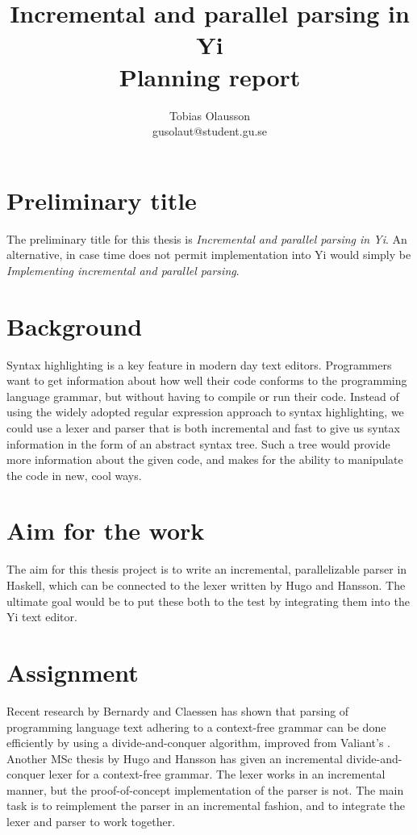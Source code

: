 \documentclass[a4paper,12pt]{article}
\title{Incremental and parallel parsing in Yi \\ 
       \small{Planning report}}
\author{Tobias Olausson \\ \small{gusolaut@student.gu.se}}
\date{}
\begin{document}
\maketitle

\section*{Preliminary title}
The preliminary title for this thesis is \textit{Incremental and parallel
parsing in Yi}. An alternative, in case time does not permit implementation into
Yi would simply be \textit{Implementing incremental and parallel parsing}.

\section*{Background}
Syntax highlighting is a key feature in modern day text editors. Programmers
want to get information about how well their code conforms to the programming
language grammar, but without having to compile or run their code. Instead of
using the widely adopted regular expression approach to syntax highlighting, we
could use a lexer and parser that is both incremental and fast to give us syntax
information in the form of an abstract syntax tree. Such a tree would provide
more information about the given code, and makes for the ability to manipulate
the code in new, cool ways.

\section*{Aim for the work}
The aim for this thesis project is to write an incremental, parallelizable
parser in Haskell, which can be connected to the lexer written by Hugo and
Hansson\cite{hugohansson}. The ultimate goal would be to put these both to the
test by integrating them into the Yi text editor.

\section*{Assignment}
Recent research by Bernardy and Claessen\cite{parparsepaper} has shown that
parsing of programming language text adhering to a context-free grammar can be
done efficiently by using a divide-and-conquer algorithm, improved from
Valiant's \cite{valiant}.  Another MSc thesis by Hugo and Hansson has given an
incremental divide-and-conquer lexer for a context-free grammar. The lexer works
in an incremental manner, but the proof-of-concept implementation of the parser
is not. The main task is to reimplement the parser in an incremental fashion,
and to integrate the lexer and parser to work together. 
\end{document}
